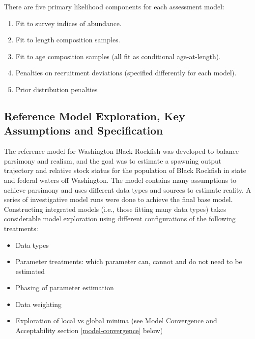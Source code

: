 \documentclass[11pt,
  english,
  letterpaper,
]{article}
\providecommand{\tightlist}{%
  \setlength{\itemsep}{0pt}\setlength{\parskip}{0pt}}
\providecommand{\tightlist}{%
  \setlength{\itemsep}{0pt}\setlength{\parskip}{0pt}}
\begin{document}
There are five primary likelihood components for each assessment model:

\begin{enumerate}
\def\labelenumi{\arabic{enumi}.}
\tightlist
\item
  Fit to survey indices of abundance.
\item
  Fit to length composition samples.
\item
  Fit to age composition samples (all fit as conditional age-at-length).
\item
  Penalties on recruitment deviations (specified differently for each model).
\item
  Prior distribution penalties
\end{enumerate}

\hypertarget{reference-model-exploration-key-assumptions-and-specification}{%
\subsection{Reference Model Exploration, Key Assumptions and Specification}\label{reference-model-exploration-key-assumptions-and-specification}}

The reference model for Washington Black Rockfish was developed to balance parsimony and realism, and the goal was to estimate a spawning output trajectory and relative stock status for the population of Black Rockfish in state and federal waters off Washington. The model contains many assumptions to achieve parsimony and uses different data types and sources to estimate reality. A series of investigative model runs were done to achieve the final base model. Constructing integrated models (i.e., those fitting many data types) takes considerable model exploration using different configurations of the following treatments:

\begin{itemize}
\tightlist
\item
  Data types
\item
  Parameter treatments: which parameter can, cannot and do not need to be estimated
\item
  Phasing of parameter estimation
\item
  Data weighting
\item
  Exploration of local vs global minima (see Model Convergence and Acceptability section \ref{model-convergence} below)
\end{itemize}
\end{document}
